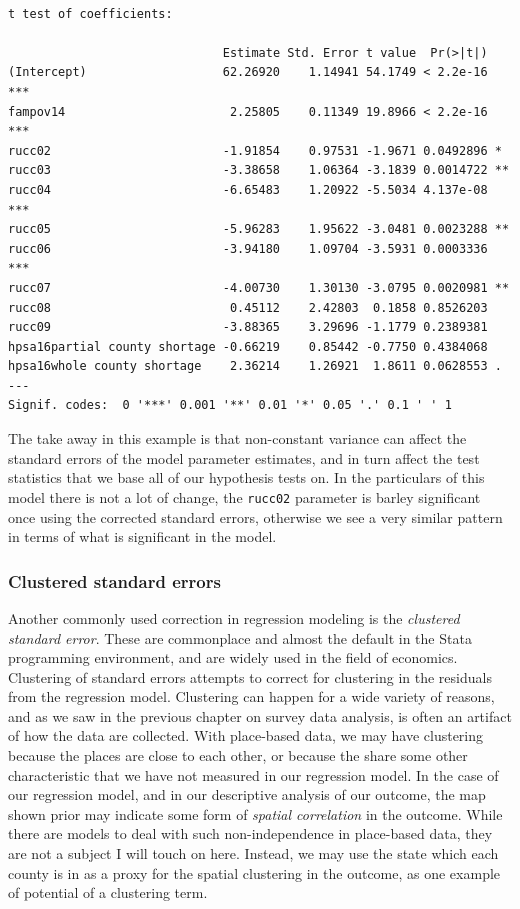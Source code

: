 \documentclass[
  letterpaper,
  DIV=11,
  numbers=noendperiod]{scrreprt}
\begin{document}
\begin{verbatim}

t test of coefficients:

                              Estimate Std. Error t value  Pr(>|t|)    
(Intercept)                   62.26920    1.14941 54.1749 < 2.2e-16 ***
fampov14                       2.25805    0.11349 19.8966 < 2.2e-16 ***
rucc02                        -1.91854    0.97531 -1.9671 0.0492896 *  
rucc03                        -3.38658    1.06364 -3.1839 0.0014722 ** 
rucc04                        -6.65483    1.20922 -5.5034 4.137e-08 ***
rucc05                        -5.96283    1.95622 -3.0481 0.0023288 ** 
rucc06                        -3.94180    1.09704 -3.5931 0.0003336 ***
rucc07                        -4.00730    1.30130 -3.0795 0.0020981 ** 
rucc08                         0.45112    2.42803  0.1858 0.8526203    
rucc09                        -3.88365    3.29696 -1.1779 0.2389381    
hpsa16partial county shortage -0.66219    0.85442 -0.7750 0.4384068    
hpsa16whole county shortage    2.36214    1.26921  1.8611 0.0628553 .  
---
Signif. codes:  0 '***' 0.001 '**' 0.01 '*' 0.05 '.' 0.1 ' ' 1
\end{verbatim}

The take away in this example is that non-constant variance can affect
the standard errors of the model parameter estimates, and in turn affect
the test statistics that we base all of our hypothesis tests on. In the
particulars of this model there is not a lot of change, the
\texttt{rucc02} parameter is barley significant once using the corrected
standard errors, otherwise we see a very similar pattern in terms of
what is significant in the model.

\hypertarget{clustered-standard-errors}{%
\subsubsection{Clustered standard
errors}\label{clustered-standard-errors}}

Another commonly used correction in regression modeling is the
\emph{clustered standard error}. These are commonplace and almost the
default in the Stata programming environment, and are widely used in the
field of economics. Clustering of standard errors attempts to correct
for clustering in the residuals from the regression model. Clustering
can happen for a wide variety of reasons, and as we saw in the previous
chapter on survey data analysis, is often an artifact of how the data
are collected. With place-based data, we may have clustering because the
places are close to each other, or because the share some other
characteristic that we have not measured in our regression model. In the
case of our regression model, and in our descriptive analysis of our
outcome, the map shown prior may indicate some form of \emph{spatial
correlation} in the outcome. While there are models to deal with such
non-independence in place-based data, they are not a subject I will
touch on here. Instead, we may use the state which each county is in as
a proxy for the spatial clustering in the outcome, as one example of
potential of a clustering term.
\end{document}
